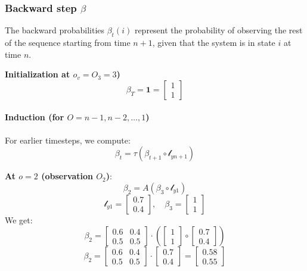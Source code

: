 \subsubsection{Backward step $\beta$}

The backward probabilities \( \beta_t(i) \) represent the probability of observing the rest of the sequence starting from time \( n+1 \), given that the system is in state \( i \) at time \( n \).

\textbf{Initialization at \( o_v = O_3 = 3\))}
  \[
  \beta_T = \mathbf{1} = \begin{bmatrix} 1 \\ 1 \end{bmatrix}
  \]

\paragraph{Induction (for \( O = n-1, n-2, \dots, 1 \))}
  
  For earlier timesteps, we compute:
  \[
  \beta_t = \tau (\beta_{t+1} \circ \mathcal{l}_{yn+1})
  \]

  \textbf{At \( o = 2 \) (observation \( O_2 \))}:
  \[
  \beta_2 = A (\beta_3 \circ \mathcal{l}_{y1})
  \]
  \[
  \mathcal{l}_{y1} = \begin{bmatrix} 0.7 \\ 0.4 \end{bmatrix}, \quad \beta_3 = \begin{bmatrix} 1 \\ 1 \end{bmatrix}
  \]
  We get:
  \[
  \beta_2 = \begin{bmatrix} 0.6 & 0.4 \\ 0.5 & 0.5 \end{bmatrix} \cdot \left(\begin{bmatrix}
    1 \\ 1
  \end{bmatrix} \circ \begin{bmatrix}
    0.7 \\ 0.4 \end{bmatrix}\right) 
\] 
\[
\beta_2 = \begin{bmatrix} 0.6 & 0.4 \\ 0.5 & 0.5 \end{bmatrix} \cdot \begin{bmatrix} 0.7 \\ 0.4 \end{bmatrix} = \begin{bmatrix} 0.58 \\ 0.55 \end{bmatrix}
  \]

